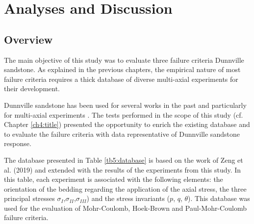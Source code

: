 \chapter{Analyses and Discussion}\label{ch5:chapter5}


\section{Overview}\label{ch5:database}

The main objective of this study was to evaluate three failure criteria Dunnville sandstone. As explained in the previous chapters, the empirical nature of most failure criteria requires a thick database of diverse multi-axial experiments for their development. 

Dunnville sandstone has been used for several works in the past and particularly for multi-axial experiments \cite{Labuz2018}\cite{Zeng2019}\cite{Tarokh2016}. The tests performed in the scope of this study (cf. Chapter \ref{ch4:title}) presented the opportunity to enrich the existing database and to evaluate the failure criteria with data representative of Dunnville sandstone response.

The database presented in Table \ref{tb5:database} is based on the work of Zeng et al. (2019) \cite{Zeng2019} and extended with the results of the experiments from this study. In this table, each experiment is associated with the following elements: the orientation of the bedding regarding the application of the axial stress, the three principal stresses  $\sigma_I$,$\sigma_{II}$,$\sigma_{III}$) and the stress invariants ($p$, $q$, $\theta$). This database was used for the evaluation of Mohr-Coulomb, Hoek-Brown and Paul-Mohr-Coulomb failure criteria.

